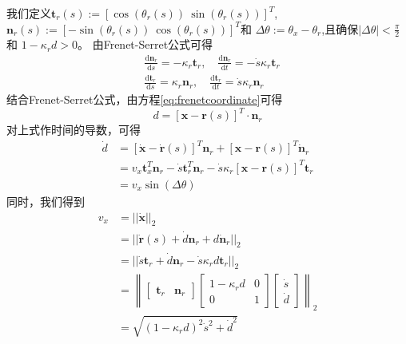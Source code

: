 我们定义$\bm{t}_r(s):=[\cos(\theta_r(s)) \: \sin(\theta_r(s))]^T$,
$\bm{n}_r(s):=[ -\sin(\theta_r(s)) \: \cos(\theta_r(s))]^T$和
$\Delta \theta:=\theta_x - \theta_r$,且确保$|\Delta \theta| < \frac{\pi}{2}$和
$1-\kappa_r d >0$。
由Frenet-Serret公式可得
\begin{equation}
  \begin{aligned}
    &\frac{\mathrm{d} \bm{n}_r}{\mathrm{d} s} = -{\kappa}_r \bm{t}_r, \quad
    \frac{\mathrm{d} \bm{n}_r}{\mathrm{d} t} = -\dot{s}{\kappa}_r \bm{t}_r \\
    &\frac{\mathrm{d} \bm{t}_r}{\mathrm{d} s} = {\kappa}_r \bm{n}_r, \quad
    \frac{\mathrm{d} \bm{t}_r}{\mathrm{d} t} = \dot{s} {\kappa}_r \bm{n}_r
  \end{aligned}
\end{equation}
结合Frenet-Serret公式，由方程\ref{eq:frenetcoordinate}可得
\begin{equation}
  d=[\bm{x}-\bm{r}(s)]^T \cdot \bm{n}_r
\end{equation}
对上式作时间的导数，可得
\begin{equation}
  \begin{aligned}
    \dot{d}
    &=[\dot{\bm{x}}-\dot{\bm{r}}(s)]^T \bm{n}_r +
            [\bm{x}-\bm{r}(s)]^T \dot{\bm{n}}_r \\
    &=v_x \bm{t}_x^T \bm{n}_r - \dot{s} \bm{t}_r^T \bm{n}_r - \dot{s} {\kappa}_r
    [\bm{x}-\bm{r}(s)]^T \bm{t}_r \\
    &= v_x \sin(\Delta \theta)
  \end{aligned}
\end{equation}
同时，我们得到
\begin{equation}
  \begin{aligned}
    v_x
    &= || \dot{\bm{x}} ||_2 \\
    &= || \dot{\bm{r}}(s) + \dot{d} \bm{n}_r +d \dot{\bm{n}}_r ||_2 \\
    &= || \dot{s}\bm{t}_r + \dot{d} \bm{n}_r - \dot{s} {\kappa}_r d \bm{t}_r ||_2 \\
    &= \left\|
        \left[
          \begin{array}{cc}
            {\bm{t}_{r}} & {\bm{n}_{r}}
          \end{array}
        \right]
        \left[
          \begin{array}{cc}
            {1-\kappa_{r} d} & {0} \\ {0} & {1}
          \end{array}
        \right]
        \left[
          \begin{array}{c}
            {\dot{s}} \\ {\dot{d}}
          \end{array}
        \right]
      \right\|_2 \\
    &= \sqrt{(1-{\kappa}_r d)^2 \dot{s}^2 +\dot{d}^2}
  \end{aligned}
\end{equation}
